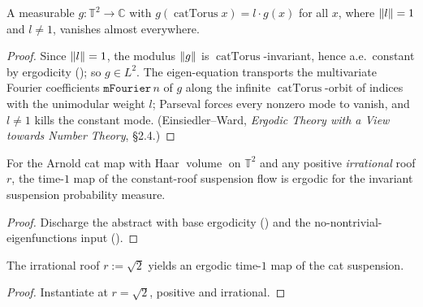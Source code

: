 \begin{theorem}\label{thm:catTorus-eigZero}
  \leanok
  A measurable \(g : \mathbb{T}^2 \to \mathbb{C}\) with \(g(\operatorname{catTorus} x) = l\cdot g(x)\)
  for all \(x\), where \(\left\lVert l \right\rVert = 1\) and \(l \ne 1\), vanishes almost everywhere.
\end{theorem}
\begin{proof}\leanok
  Since \(\left\lVert l \right\rVert = 1\), the modulus \(\left\lVert g \right\rVert\) is \(\operatorname{catTorus}\)-invariant, hence
  a.e.\ constant by ergodicity (); so \(g \in L^2\). The eigen-equation
  transports the multivariate Fourier coefficients \(\texttt{mFourier}\,n\) of \(g\) along the
  infinite \(\operatorname{catTorus}\)-orbit of indices with the unimodular weight \(l\); Parseval
  forces every nonzero mode to vanish, and \(l \ne 1\) kills the constant mode. (Einsiedler--Ward,
  \emph{Ergodic Theory with a View towards Number Theory}, \S2.4.)
\end{proof}

\begin{theorem}\label{thm:catSusp-timeOne}
  \leanok
  For the Arnold cat map with Haar \(\operatorname{volume}\) on \(\mathbb{T}^2\) and any positive
  \emph{irrational} roof \(r\), the time-\(1\) map of the constant-roof suspension flow is ergodic
  for the invariant suspension probability measure.
\end{theorem}
\begin{proof}\leanok
  Discharge the abstract  with base ergodicity
  () and the no-nontrivial-eigenfunctions input
  ().
\end{proof}

\begin{theorem}[Concrete non-vacuity witness $r = \sqrt2$]\label{thm:catSusp-sqrt2}
  \leanok
  The irrational roof \(r := \sqrt2\) yields an ergodic time-\(1\) map of the cat suspension.
\end{theorem}
\begin{proof}\leanok
  Instantiate  at \(r = \sqrt2\), positive and irrational.
\end{proof}

